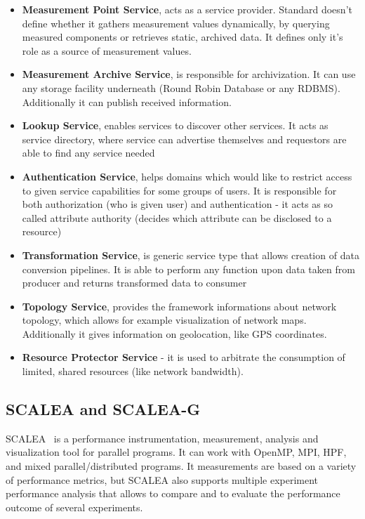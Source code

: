 \begin{itemize}
\item{ {\bf Measurement Point Service}, acts as a service provider. Standard doesn\rq{}t define whether it gathers measurement values dynamically, by querying measured components or retrieves static, archived data. It defines only it\rq{}s role as a source of measurement values. }
\item{ {\bf Measurement Archive Service}, is responsible for archivization. It can use any storage facility underneath (Round Robin Database or any RDBMS). Additionally it can publish received information. }
\item{ {\bf Lookup Service}, enables services to discover other services. It acts as service directory, where service can advertise themselves and requestors are able to find any service needed}
\item{ {\bf Authentication Service}, helps domains which would like to restrict access to given service capabilities for some groups of users. It is responsible for both authorization (who is given user) and authentication - it acts as so called attribute authority (decides which attribute can be disclosed to a resource)}
\item{ {\bf Transformation Service}, is generic service type that allows creation of data conversion pipelines. It is able to perform any function upon data taken from producer and returns transformed data to consumer}
\item{ {\bf Topology Service}, provides the framework informations about network topology, which allows for example visualization of network maps. Additionally it gives information on geolocation, like GPS coordinates.}
\item{ {\bf Resource Protector Service} - it is used to arbitrate the consumption of limited, shared resources (like network bandwidth).}
\end{itemize}



\subsection{SCALEA and SCALEA-G}

SCALEA~\cite{SCALEA1} is a performance instrumentation, measurement, analysis and visualization tool for parallel programs. It can work with OpenMP, MPI, HPF, and
mixed parallel/distributed programs. It measurements are based on a variety of performance metrics, but SCALEA also supports multiple experiment performance
analysis that allows to compare and to evaluate the performance outcome of several experiments.

